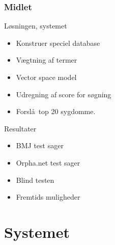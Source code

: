 \documentclass[xcolor=table]{beamer}
\begin{document}
\begin{frame}

  \frametitle{Midlet}

  \begin{block}{L\o sningen, systemet}

    \begin{itemize}

      \item Konstruer speciel database
      \item V\ae gtning af termer
      \item Vector space model
      \item Udregning af score for s\o gning
      \item Forsl\aa\ top 20 sygdomme.
    \end{itemize}

  \end{block}

  \begin{block}{Resultater}

    \begin{itemize}

      \item BMJ test sager
      \item Orpha.net test sager
      \item Blind testen
    \end{itemize}

  \end{block}

  \begin{itemize}
    \item Fremtids muligheder
  \end{itemize}

\end{frame}

\section{Systemet}

\subsection*{}
\end{document}

